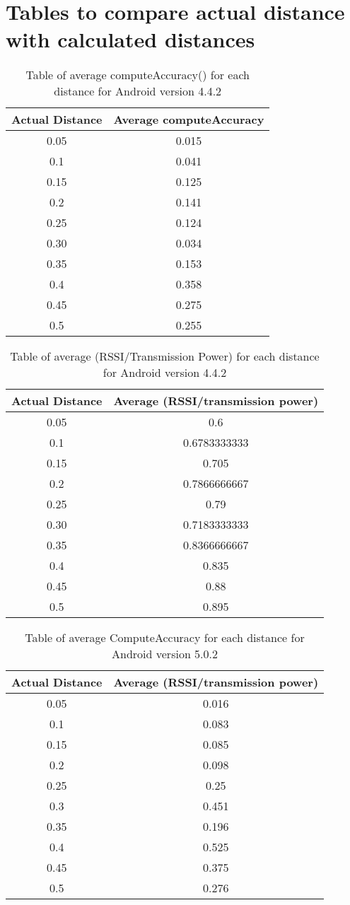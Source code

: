 
\section{Tables to compare actual distance with calculated distances}
\begin{table}[H]
\begin{tabular}{|c|c|}
\hline 
Actual Distance & Average computeAccuracy\tabularnewline
\hline 
\hline 
0.05 & 0.015\tabularnewline
\hline 
0.1 & 0.041\tabularnewline
\hline 
0.15 & 0.125\tabularnewline
\hline 
0.2 & 0.141\tabularnewline
\hline 
0.25 & 0.124\tabularnewline
\hline 
0.30 & 0.034\tabularnewline
\hline 
0.35 & 0.153\tabularnewline
\hline 
0.4 & 0.358\tabularnewline
\hline 
0.45 & 0.275\tabularnewline
\hline 
0.5 & 0.255\tabularnewline
\hline 
\end{tabular}

\protect\caption{Table of average computeAccuracy() for each distance for Android version 4.4.2}
\label{tableOfComputeAccuracyOldAndroid}
\end{table}


\begin{table}[H]
\begin{tabular}{|c|c|}
\hline 
Actual Distance & Average (RSSI/transmission power)\tabularnewline
\hline 
\hline 
0.05 & 0.6\tabularnewline
\hline 
0.1 & 0.6783333333\tabularnewline
\hline 
0.15 & 0.705\tabularnewline
\hline 
0.2 & 0.7866666667\tabularnewline
\hline 
0.25 & 0.79\tabularnewline
\hline 
0.30 & 0.7183333333\tabularnewline
\hline 
0.35 & 0.8366666667\tabularnewline
\hline 
0.4 & 0.835\tabularnewline
\hline 
0.45 & 0.88\tabularnewline
\hline 
0.5 & 0.895\tabularnewline
\hline 
\end{tabular}
\protect\caption{Table of average (RSSI/Transmission Power) for each distance for Android version 4.4.2}
\label{tableOfRSSIOldAndroid}
\end{table}



\begin{table}[H]
\begin{tabular}{|c|c|}
\hline 
Actual Distance & Average (RSSI/transmission power)\tabularnewline
\hline 
\hline 
0.05 & 0.016\tabularnewline
\hline 
0.1 & 0.083\tabularnewline
\hline 
0.15 & 0.085\tabularnewline
\hline 
0.2 & 0.098\tabularnewline
\hline 
0.25 & 0.25\tabularnewline
\hline 
0.3 & 0.451\tabularnewline
\hline 
0.35 & 0.196\tabularnewline
\hline 
0.4 & 0.525\tabularnewline
\hline 
0.45 & 0.375\tabularnewline
\hline 
0.5 & 0.276\tabularnewline
\hline 
\end{tabular}
\protect\caption{Table of average ComputeAccuracy for each distance for Android version 5.0.2}
\label{tableOfComputeAccuracyNewAndroid}
\end{table}

